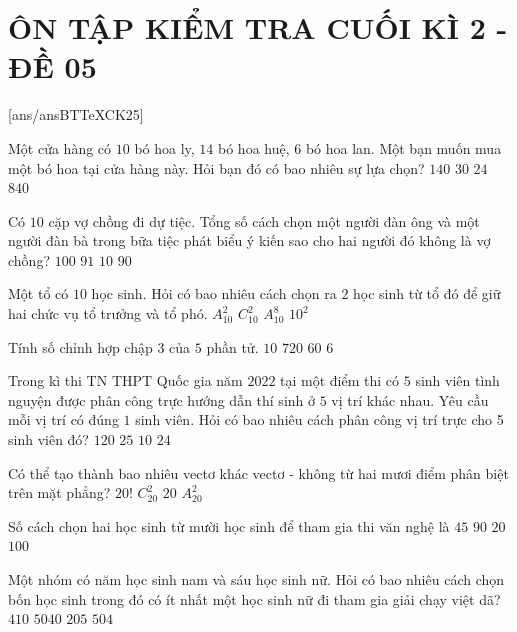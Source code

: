 \section*{ÔN TẬP KIỂM TRA CUỐI KÌ 2 - ĐỀ 05}
\setcounter{ex}{0}\setcounter{bt}{0}
[ans/ansBTTeXCK25]
\begin{ex}
Một cửa hàng có $10$ bó hoa ly, $14$ bó hoa huệ, $6$ bó hoa lan. Một bạn muốn mua một bó hoa tại cửa hàng này. Hỏi bạn đó có bao nhiêu sự lựa chọn?
\choice
{$140$}
{$30$}
{$24$}
{$840$}
\end{ex}
\begin{ex}
Có $10$ cặp vợ chồng đi dự tiệc. Tổng số cách chọn một người đàn ông và một người đàn bà trong bữa tiệc phát biểu ý kiến sao cho hai người đó không là vợ chồng?
\choice
{$100$}
{$91$}
{$10$}
{$90$}
\end{ex}
\begin{ex}
Một tổ có $10$ học sinh. Hỏi có bao nhiêu cách chọn ra $2$ học sinh từ tổ đó để giữ hai chức vụ tổ trưởng và tổ phó.
\choice
{$A_{10}^2$}
{$C_{10}^2$}
{$A_{10}^8$}
{$10^2$}
\end{ex}
\begin{ex}
Tính số chỉnh hợp chập $3$ của $5$ phần tử.
\choice
{$10$}
{$720$}
{$60$}
{$6$}
\end{ex}
\begin{ex}
Trong kì thi TN THPT Quốc gia năm $2022$ tại một điểm thi có $5$ sinh viên tình nguyện được phân công trực hướng dẫn thí sinh ở $5$ vị trí khác nhau. Yêu cầu mỗi vị trí có đúng $1$ sinh viên. Hỏi có bao nhiêu cách phân công vị trí trực cho 5 sinh viên đó?
\choice
{$120$}
{$25$}
{$10$}
{$24$}
\end{ex}
\begin{ex}
Có thể tạo thành bao nhiêu vectơ khác vectơ - không từ hai mươi điểm phân biệt trên mặt phẳng?
\choice
{$20!$}
{$C_{20}^2$}
{$20$}
{$A_{20}^2$}
\end{ex}
\begin{ex}
Số cách chọn hai học sinh từ mười học sinh để tham gia thi văn nghệ là
\choice
{$45$}
{$90$}
{$20$}
{$100$}
\end{ex}
\begin{ex}
Một nhóm có năm học sinh nam và sáu học sinh nữ. Hỏi có bao nhiêu cách chọn bốn học sinh trong đó có ít nhất một học sinh nữ đi tham gia giải chạy việt dã?
\choice
{$410$}
{$5040$}
{$205$}
{$504$}
\end{ex}
